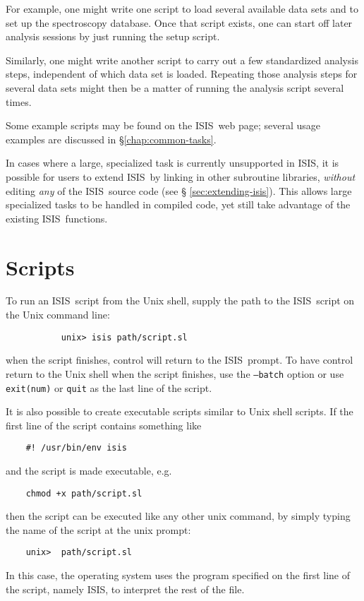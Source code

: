 \documentclass{book}
\newcommand{\isisx}{{\sc ISIS~}}
\newcommand{\isis}{{\sc ISIS}}
\begin{document}
For example, one might write one script to load several available data
sets and to set up the spectroscopy database.  Once that script exists,
one can start off later analysis sessions by just running the setup
script.

Similarly, one might write another script to carry out a few standardized
analysis steps, independent of which data set is loaded.  Repeating those
analysis steps for several data sets might then be a matter of running the
analysis script several times.

Some example scripts may be found on the \isisx web page; several
usage examples are discussed in \S\ref{chap:common-tasks}.

In cases where a large, specialized task is currently unsupported in \isis,
it is possible for users to extend \isisx by linking in other subroutine
libraries, {\it without} editing {\it any} of the \isisx source code (see \S
\ref{sec:extending-isis}). This allows large specialized tasks to be handled
in compiled code, yet still take advantage of the existing \isisx functions.

\section{Scripts}
\label{sec:scripts}

To run an \isisx script from the Unix shell, supply the path to the
\isisx script on the Unix command line:
\begin{verbatim}
           unix> isis path/script.sl
\end{verbatim}
when the script finishes, control will return to the
\isisx prompt.  To have control return to the Unix shell when
the script finishes, use the {\tt --batch} option or use
{\tt exit(num)} or {\tt quit} as the last line of the script.

It is also possible to create executable scripts similar to Unix
shell scripts.  If the first line of the script contains
something like
\begin{verbatim}
    #! /usr/bin/env isis
\end{verbatim}
and the script is made executable, e.g.
\begin{verbatim}
    chmod +x path/script.sl
\end{verbatim}
then the script can be executed like any other unix command,
by simply typing the name of the script at the unix prompt:
\begin{verbatim}
    unix>  path/script.sl
\end{verbatim}
In this case, the operating system uses the program specified
on the first line of the script, namely \isis, to interpret
the rest of the file.
\end{document}
